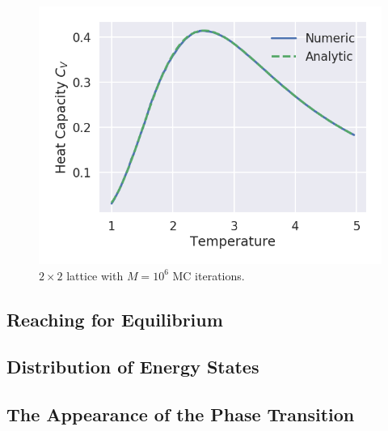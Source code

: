\documentclass[aps,reprint]{revtex4-1}
\begin{document}
\begin{figure}[H]
  \centering
  \includegraphics[width=\columnwidth]{figures/L2Ne6.png}
  \caption{$2 \times 2$ lattice with $M = 10^6$ MC iterations.}
  \label{fig:L2Ne6}
\end{figure}

\subsection{Reaching for Equilibrium}
\label{sec:reaching-equilibrium}


\subsection{Distribution of Energy States}
\label{sec:distr-energy-stat}

\subsection{The Appearance of the Phase Transition}
\label{sec:appe-phase-trans}
\end{document}
